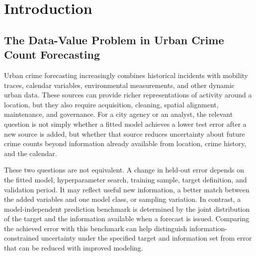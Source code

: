 \documentclass[applsci,article,accept,moreauthors]{Definitions/mdpi}
\def\hl#1{#1}%
\begin{document}
\section{Introduction}
\label{sec:introduction}

\subsection{The Data-Value Problem in Urban Crime Count Forecasting}
\label{subsec:intro_data_value}

Urban crime forecasting increasingly combines historical incidents with
mobility traces, calendar variables, environmental measurements, and other
dynamic urban data. These sources can provide richer representations of activity
around a location, but they also require acquisition, cleaning, spatial
alignment, maintenance, and governance. For a city agency or an analyst, the
relevant question is not simply whether a fitted model achieves a
lower test error after a new source is added, but whether that source
reduces uncertainty about future crime counts beyond information already
available from location, crime history, and the calendar.

These two questions are not equivalent. A change in held-out error depends on
the fitted model, hyperparameter search, training sample, target definition,
and validation period. It may reflect useful new information, a better match
between the added variables and one model class, or sampling variation. In
contrast, a model-independent prediction benchmark is determined by the joint
distribution of the target and the information available when a forecast is
issued. Comparing the achieved error with this benchmark can help distinguish
information-constrained uncertainty under the specified target
\hl{and information set from error} that can be reduced with improved
modeling.%
\end{document}
